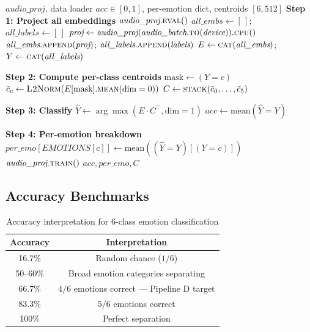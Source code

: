 \documentclass[12pt,a4paper]{article}
\theoremstyle{definition}
\theoremstyle{remark}
\begin{document}
\begin{algorithm}[H]
\caption{Emotion Accuracy Evaluation via Centroid Nearest-Neighbour}
\label{alg:evaluate}
\begin{algorithmic}[1]
\Require $\textit{audio\_proj}$, data loader
\Ensure $\textit{acc} \in [0,1]$, per-emotion dict, centroids $[6,512]$
\State \textbf{Step 1: Project all embeddings}
\State $\textit{audio\_proj}.\textsc{eval}()$
\State $\textit{all\_embs} \gets [\,]$; $\textit{all\_labels} \gets [\,]$
  \State $\textit{proj} \gets \textit{audio\_proj}(\textit{audio\_batch}.\textsc{to}(\textit{device})).\textsc{cpu}()$
  \State $\textit{all\_embs}.\textsc{append}(\textit{proj})$;
         $\textit{all\_labels}.\textsc{append}(\textit{labels})$
\EndFor
\State $E \gets \textsc{cat}(\textit{all\_embs})$; $Y \gets \textsc{cat}(\textit{all\_labels})$
       \Comment{$[N,512]$, $[N]$}

\State \textbf{Step 2: Compute per-class centroids}
  \State $\text{mask} \gets (Y = c)$
  \State $\bar{c}_c \gets \textsc{L2Norm}(E[\text{mask}].\textsc{mean}(\text{dim}=0))$
\EndFor
\State $C \gets \textsc{stack}(\bar{c}_0, \ldots, \bar{c}_5)$
       \Comment{$[6, 512]$}

\State \textbf{Step 3: Classify}
\State $\hat{Y} \gets \arg\max(E \cdot C^\top, \text{dim}=1)$
\State $\textit{acc} \gets \text{mean}(\hat{Y} = Y)$

\State \textbf{Step 4: Per-emotion breakdown}
  \State $\textit{per\_emo}[\textit{EMOTIONS}[c]] \gets
    \text{mean}((\hat{Y} = Y)[(Y = c)])$
\EndFor
\State $\textit{audio\_proj}.\textsc{train}()$
\State \Return $\textit{acc}, \textit{per\_emo}, C$
\end{algorithmic}
\end{algorithm}

\subsection{Accuracy Benchmarks}

\begin{table}[H]
\centering
\caption{Accuracy interpretation for 6-class emotion classification}
\begin{tabular}{cc}
\toprule
Accuracy & Interpretation \\
\midrule
16.7\% & Random chance ($1/6$) \\
50–60\% & Broad emotion categories separating \\
66.7\% & $4/6$ emotions correct — Pipeline D target \\
83.3\% & $5/6$ emotions correct \\
100\%  & Perfect separation \\
\bottomrule
\end{tabular}
\end{table}
\end{document}
